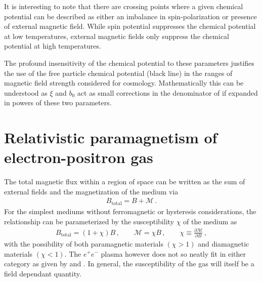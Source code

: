 It is interesting to note that there are crossing points where a given chemical potential can be described as either an imbalance in spin-polarization or presence of external magnetic field. While spin potential suppresses the chemical potential at low temperatures, external magnetic fields only suppress the chemical potential at high temperatures.

The profound insensitivity of the chemical potential to these parameters justifies the use of the free particle chemical potential (black line) in the ranges of magnetic field strength considered for cosmology. Mathematically this can be understood as $\xi$ and $b_{0}$ act as small corrections in the denominator of  if expanded in powers of these two parameters.

\section{Relativistic paramagnetism of electron-positron gas}
\label{sec:magnetization}
\noindent The total magnetic flux within a region of space can be written as the sum of external fields and the magnetization of the medium via
\begin{align}
 \label{totalmag}
 {B}_\mathrm{total} = {B} + \mathcal{M}\,.
\end{align}
For the simplest mediums without ferromagnetic or hysteresis considerations, the relationship can be parameterized by the susceptibility $\chi$ of the medium as
\begin{align}
 \label{susceptibility}
 {B}_\mathrm{total} = (1+\chi){B}\,,\qquad \mathcal{M} = \chi{B}\,,\qquad \chi\equiv\frac{\partial\mathcal{M}}{\partial{B}}\,,
\end{align}
with the possibility of both paramagnetic materials $(\chi>1)$ and diamagnetic materials $(\chi<1)$. The $e^{+}e^{-}$ plasma however does not so neatly fit in either category as given by  and . In general, the susceptibility of the gas will itself be a field dependant quantity.

